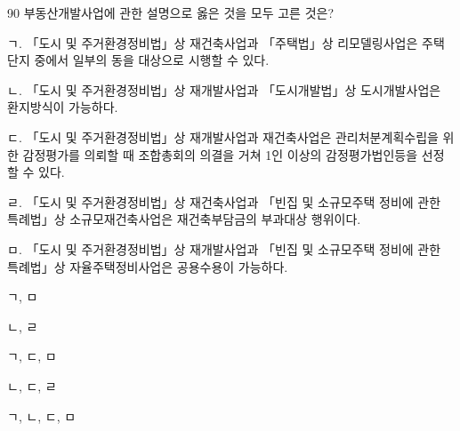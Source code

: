 \begin{question}{90}
부동산개발사업에 관한 설명으로 옳은 것을 모두 고른 것은?
\begin{framedtext}
ㄱ. 「도시 및 주거환경정비법」상 재건축사업과 「주택법」상 리모델링사업은 주택 단지 중에서 일부의 동을 대상으로 시행할 수 있다. \par
ㄴ. 「도시 및 주거환경정비법」상 재개발사업과 「도시개발법」상 도시개발사업은 환지방식이 가능하다. \par
ㄷ. 「도시 및 주거환경정비법」상 재개발사업과 재건축사업은 관리처분계획수립을 위한 감정평가를 의뢰할 때 조합총회의 의결을 거쳐 1인 이상의 감정평가법인등을 선정할 수 있다. \par
ㄹ. 「도시 및 주거환경정비법」상 재건축사업과 「빈집 및 소규모주택 정비에 관한 특례법」상 소규모재건축사업은 재건축부담금의 부과대상 행위이다. \par
ㅁ. 「도시 및 주거환경정비법」상 재개발사업과 「빈집 및 소규모주택 정비에 관한 특례법」상 자율주택정비사업은 공용수용이 가능하다. \par
\end{framedtext}
\begin{choices}
  \item ㄱ, ㅁ
  \item ㄴ, ㄹ
  \item ㄱ, ㄷ, ㅁ
  \item ㄴ, ㄷ, ㄹ
  \item ㄱ, ㄴ, ㄷ, ㅁ
\end{choices}
\end{question}
